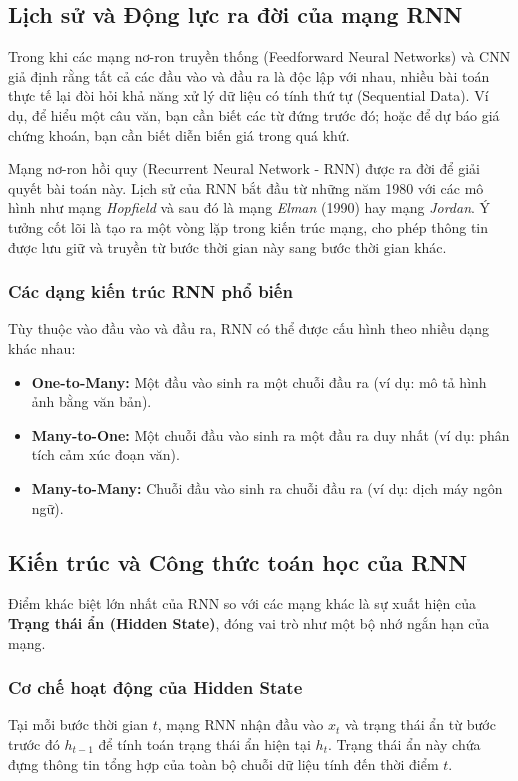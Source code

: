 \subsection{Lịch sử và Động lực ra đời của mạng RNN}
Trong khi các mạng nơ-ron truyền thống (Feedforward Neural Networks) và CNN giả định rằng tất cả các đầu vào và đầu ra là độc lập với nhau, nhiều bài toán thực tế lại đòi hỏi khả năng xử lý dữ liệu có tính thứ tự (Sequential Data). Ví dụ, để hiểu một câu văn, bạn cần biết các từ đứng trước đó; hoặc để dự báo giá chứng khoán, bạn cần biết diễn biến giá trong quá khứ.

Mạng nơ-ron hồi quy (Recurrent Neural Network - RNN) được ra đời để giải quyết bài toán này. Lịch sử của RNN bắt đầu từ những năm 1980 với các mô hình như mạng \textit{Hopfield} và sau đó là mạng \textit{Elman} (1990) hay mạng \textit{Jordan}. Ý tưởng cốt lõi là tạo ra một vòng lặp trong kiến trúc mạng, cho phép thông tin được lưu giữ và truyền từ bước thời gian này sang bước thời gian khác.

\subsubsection{Các dạng kiến trúc RNN phổ biến}
Tùy thuộc vào đầu vào và đầu ra, RNN có thể được cấu hình theo nhiều dạng khác nhau:
\begin{itemize}
    \item \textbf{One-to-Many:} Một đầu vào sinh ra một chuỗi đầu ra (ví dụ: mô tả hình ảnh bằng văn bản).
    \item \textbf{Many-to-One:} Một chuỗi đầu vào sinh ra một đầu ra duy nhất (ví dụ: phân tích cảm xúc đoạn văn).
    \item \textbf{Many-to-Many:} Chuỗi đầu vào sinh ra chuỗi đầu ra (ví dụ: dịch máy ngôn ngữ).
\end{itemize}

\subsection{Kiến trúc và Công thức toán học của RNN}
Điểm khác biệt lớn nhất của RNN so với các mạng khác là sự xuất hiện của \textbf{Trạng thái ẩn (Hidden State)}, đóng vai trò như một bộ nhớ ngắn hạn của mạng.

\subsubsection{Cơ chế hoạt động của Hidden State}
Tại mỗi bước thời gian $t$, mạng RNN nhận đầu vào $x_t$ và trạng thái ẩn từ bước trước đó $h_{t-1}$ để tính toán trạng thái ẩn hiện tại $h_t$. Trạng thái ẩn này chứa đựng thông tin tổng hợp của toàn bộ chuỗi dữ liệu tính đến thời điểm $t$.

